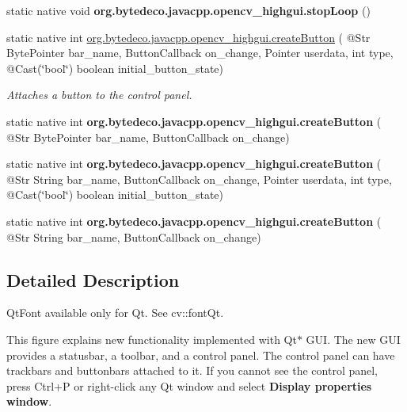 \begin{DoxyCompactItemize}
\item 
\mbox{\label{group__highgui__qt_ga0f99dc3fbc4af5ab149b3ed5bc5639fa}} 
static native void {\bfseries org.\+bytedeco.\+javacpp.\+opencv\+\_\+highgui.\+stop\+Loop} ()
\item 
static native int \hyperlink{group__highgui__qt_ga5dc4aba06e0c07797e0dcc3dc0920d4c}{org.\+bytedeco.\+javacpp.\+opencv\+\_\+highgui.\+create\+Button} ( @Str Byte\+Pointer bar\+\_\+name, Button\+Callback on\+\_\+change, Pointer userdata, int type, @Cast(\char`\"{}bool\char`\"{}) boolean initial\+\_\+button\+\_\+state)
\begin{DoxyCompactList}\small\item\em Attaches a button to the control panel. \end{DoxyCompactList}\item 
\mbox{\label{group__highgui__qt_ga1c997ad7ed40ced7d10e7dd5b8af06aa}} 
static native int {\bfseries org.\+bytedeco.\+javacpp.\+opencv\+\_\+highgui.\+create\+Button} ( @Str Byte\+Pointer bar\+\_\+name, Button\+Callback on\+\_\+change)
\item 
\mbox{\label{group__highgui__qt_gae990ea57b212ee8ebd4b9009f6e7f00e}} 
static native int {\bfseries org.\+bytedeco.\+javacpp.\+opencv\+\_\+highgui.\+create\+Button} ( @Str String bar\+\_\+name, Button\+Callback on\+\_\+change, Pointer userdata, int type, @Cast(\char`\"{}bool\char`\"{}) boolean initial\+\_\+button\+\_\+state)
\item 
\mbox{\label{group__highgui__qt_ga3abbb20826602d65050aef061238f49b}} 
static native int {\bfseries org.\+bytedeco.\+javacpp.\+opencv\+\_\+highgui.\+create\+Button} ( @Str String bar\+\_\+name, Button\+Callback on\+\_\+change)
\end{DoxyCompactItemize}


\subsection{Detailed Description}
Qt\+Font available only for Qt. See cv\+::font\+Qt. 

 

This figure explains new functionality implemented with Qt$\ast$ G\+UI. The new G\+UI provides a statusbar, a toolbar, and a control panel. The control panel can have trackbars and buttonbars attached to it. If you cannot see the control panel, press Ctrl+P or right-\/click any Qt window and select {\bfseries Display properties window}. 


